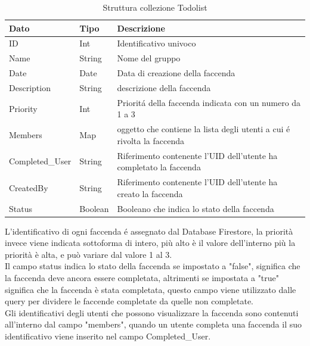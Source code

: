 \begin{table}[h]
\begin{center}
\begin{tabular}{|l|l|p{9cm}|}
    \hline
\textbf{Dato} & \textbf{Tipo}  & \textbf{Descrizione}\\ \hline
ID & Int & Identificativo univoco \\ \hline
Name & String & Nome del gruppo \\ \hline
Date & Date & Data di creazione della faccenda \\ \hline
Description & String & descrizione della faccenda \\ \hline
Priority & Int & Priorit\'a della faccenda indicata con un numero da 1 a 3 \\ \hline
Members & Map & oggetto che contiene la lista degli utenti a cui \'e rivolta la faccenda \\ \hline
Completed\_User & String & Riferimento contenente l'UID dell'utente ha completato la faccenda\\ \hline
CreatedBy & String &  Riferimento contenente l'UID dell'utente ha creato la faccenda \\ \hline
Status & Boolean & Booleano che indica lo stato della faccenda\\
\hline
\end{tabular}
\caption[Collezione Todolist]{Struttura collezione Todolist}\label{tab:Strutture collezzione Todolist}
\end{center}
\end{table}

L'identificativo di ogni faccenda \'e assegnato dal Database Firestore, la priorità invece viene indicata sottoforma di intero, più alto è il valore dell'interno più la priorità è alta, e può variare dal valore 1 al 3.\\
Il campo status indica lo stato della faccenda se impostato a "false", significa che la faccenda deve ancora essere completata, altrimenti se impostata a "true" significa che la faccenda è stata completata, questo campo viene utilizzato dalle query per dividere le faccende completate da quelle non completate.\\
Gli identificativi degli utenti che possono visualizzare la faccenda sono contenuti all'interno dal campo "members", quando un utente completa una faccenda il suo identificativo viene inserito nel campo Completed\_User.





